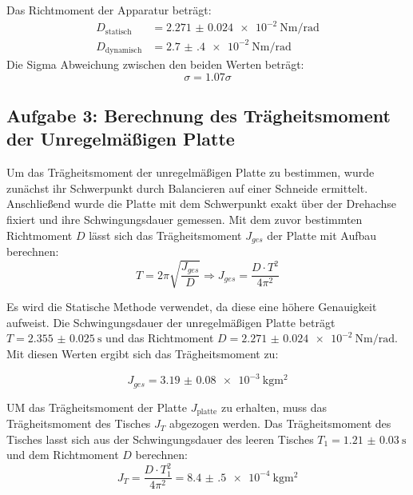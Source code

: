 \documentclass[12pt,a4paper,titlepage]{scrartcl}
\numberwithin{equation}{section}
\numberwithin{table}{section}
\numberwithin{figure}{section}
\begin{document}
\begin{resultbox}
    Das Richtmoment der Apparatur beträgt:
    \begin{align}
        D_\text{statisch} &= \qty{2.271(24)e-2}{\newton\meter\per\radian}\\
        D_\text{dynamisch} &= \qty{2.7(4)e-2}{\newton\meter\per\radian}
    \end{align}
    Die Sigma Abweichung zwischen den beiden Werten beträgt:
    \begin{equation}
        \sigma = 1.07\sigma
    \end{equation}
\end{resultbox}

\bigskip
\subsection{Aufgabe 3: Berechnung des Trägheitsmoment der Unregelmäßigen Platte}

Um das Trägheitsmoment der unregelmäßigen Platte zu bestimmen, wurde zunächst ihr Schwerpunkt durch Balancieren auf einer Schneide ermittelt. Anschließend wurde die Platte mit dem Schwerpunkt exakt über der Drehachse fixiert und ihre Schwingungsdauer gemessen. Mit dem zuvor bestimmten Richtmoment $D$ lässt sich das Trägheitsmoment $J_{ges}$ der Platte mit Aufbau berechnen:
\begin{equation}
    T = 2\pi \sqrt{\frac{J_{ges}}{D}}  \Rightarrow 
    J_{ges} = \frac{D \cdot T^2}{4\pi^2}
\end{equation}

Es wird die Statische Methode verwendet, da diese eine höhere Genauigkeit aufweist. Die Schwingungsdauer der unregelmäßigen Platte beträgt $T = \qty{2.355(25)}{\second}$ und das Richtmoment $D = \qty{2.271(24)e-2}{\newton\meter\per\radian}$. Mit diesen Werten ergibt sich das Trägheitsmoment zu:

\begin{equation}
    J_{ges} = \qty{3.19(8)e-3}{\kilo\gram\meter\squared}
\end{equation}

UM das Trägheitsmoment der Platte $J_\text{platte}$ zu erhalten, muss das Trägheitsmoment des Tisches $J_T$ abgezogen werden. Das Trägheitsmoment des Tisches lasst sich aus der Schwingungsdauer des leeren Tisches $T_1 = \qty{1.21(3)}{\second}$ und dem Richtmoment $D$ berechnen:
\begin{equation}
    J_T = \frac{D \cdot T_1^2}{4\pi^2} = \qty{8.4(5)e-4}{\kilo\gram\meter\squared}
\end{equation}
\end{document}
